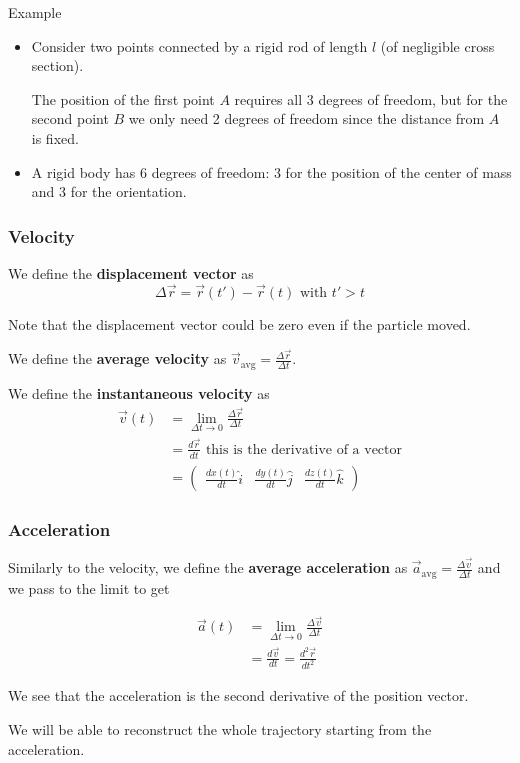 \documentclass[10pt]{extarticle}
\begin{document}
\begin{examplebox}{Example}
  \begin{itemize}
    \item Consider two points connected by a rigid rod of length $l$ (of negligible cross section).

          The position of the first point $A$ requires all 3 degrees of freedom,
          but for the second point $B$ we only need 2 degrees of freedom since the distance from $A$ is fixed.

    \item A rigid body has 6 degrees of freedom: 3 for the position of the center of mass and 3 for the orientation.
  \end{itemize}

\end{examplebox}

\subsubsection{Velocity}

We define the \textbf{displacement vector} as
$$
  \Delta \vec{r} = \vec{r}(t') - \vec{r}(t) \text{ with } t' > t
$$

Note that the displacement vector could be zero even if the particle moved.

We define the \textbf{average velocity} as $\vec{v}_{\text{avg}} = \frac{\Delta \vec{r}}{\Delta t}$.

We define the \textbf{instantaneous velocity} as
\begin{align*}
  \vec{v}(t) & = \lim_{\Delta t \to 0} \frac{\Delta \vec{r}}{\Delta t}                                                        \\
             & = \frac{d\vec{r}}{dt} \text{ this is the derivative of a vector}                                               \\
             & = \begin{pmatrix} \frac{dx(t)}{dt} \hat{i} & \frac{dy(t)}{dt} \hat{j} & \frac{dz(t)}{dt} \hat{k} \end{pmatrix}
\end{align*}

\subsubsection{Acceleration}

Similarly to the velocity, we define the \textbf{average acceleration} as $\vec{a}_{\text{avg}} = \frac{\Delta \vec{v}}{\Delta t}$
and we pass to the limit to get

\begin{align*}
  \vec{a}(t) & = \lim_{\Delta t \to 0} \frac{\Delta \vec{v}}{\Delta t} \\
             & = \frac{d\vec{v}}{dt} = \frac{d^2\vec{r}}{dt^2}
\end{align*}

We see that the acceleration is the second derivative of the position vector.

We will be able to reconstruct the whole trajectory starting from the acceleration.
\end{document}
